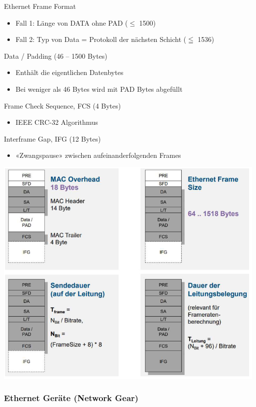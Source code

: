 \begin{definition}{Ethernet Frame Format}
\begin{minipage}{0.6\linewidth}
    \begin{itemize}
        \item Fall 1: Länge von DATA ohne PAD ($\leq$ 1500)
        \item Fall 2: Typ von Data = Protokoll der nächsten Schicht ($\leqq$ 1536)
    \end{itemize}
    Data / Padding (46 – 1500 Bytes)
    \begin{itemize}
        \item Enthält die eigentlichen Datenbytes
        \item Bei weniger als 46 Bytes wird mit PAD Bytes abgefüllt
    \end{itemize}
    Frame Check Sequence, FCS (4 Bytes)
    \begin{itemize}
        \item IEEE CRC-32 Algorithmus
    \end{itemize}
    Interframe Gap, IFG (12 Bytes)
    \begin{itemize}
        \item «Zwangspause» zwischen aufeinanderfolgenden Frames
    \end{itemize}
    \end{minipage}
    \vspace{1mm} 
    \begin{center}
        \includegraphics[width=0.8\linewidth]{images/ethernet_frame_details.png}
    \end{center}       
\end{definition}

\subsubsection{Ethernet Geräte (Network Gear)}

